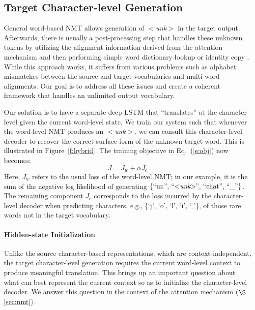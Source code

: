 \documentclass[11pt]{article}
\newcommand{\eq}[1]{Eq.~(\ref{#1})}
\newcommand{\unk}{$<${\it unk}$>$}
\begin{document}
\subsection{Target Character-level Generation}
\label{subsec:tgt}
General word-based NMT allows generation of \unk{} in the target output.
Afterwards, there is usually a post-processing step that handles
these unknown tokens by utilizing the
alignment information derived from the attention mechanism and then performing
simple word dictionary lookup or identity copy \cite{luong15attn,jean15}. 
While this approach works, it suffers from various problems such as alphabet
mismatches between the source and target vocabularies and multi-word
alignments.
Our goal is to address all
these issues and create a
coherent framework that handles an unlimited output vocabulary.

Our solution is to have a separate deep LSTM that ``translates'' at the
character level given the current word-level state. We train our system such
that whenever the word-level NMT
produces an \unk{}, we can consult this character-level decoder to recover the correct surface form of the
unknown target word. This is illustrated in Figure~\ref{f:hybrid}.
The training objective in \eq{e:obj} now becomes: %
\begin{equation}
J = J_{w} + \alpha J_{c}
\label{e:char_obj}
\end{equation}
Here, $J_{w}$ refers to the usual loss of the word-level NMT; in
our example, it is the sum of the negative log likelihood of
generating $\{\mbox{``un'', ``\unk{}'', ``chat'', ``\_''}\}$. The remaining component $J_c$
corresponds to the loss incurred by the character-level 
decoder when predicting characters, e.g., $\{\mbox{`j', `o', `l', `i',
`\_'}\}$, of those rare words not in the
target vocabulary. 


\paragraph{Hidden-state Initialization} %
\label{subsubsec:h}
Unlike the source character-based representations, which are
context-independent, the target character-level generation requires the
current word-level context to produce meaningful translation.
This brings up an important
question about what can best represent the current context so as to
initialize the character-level decoder. We answer this question in the context
of the attention mechanism ($\S$\ref{sec:nmt}). 
\end{document}
